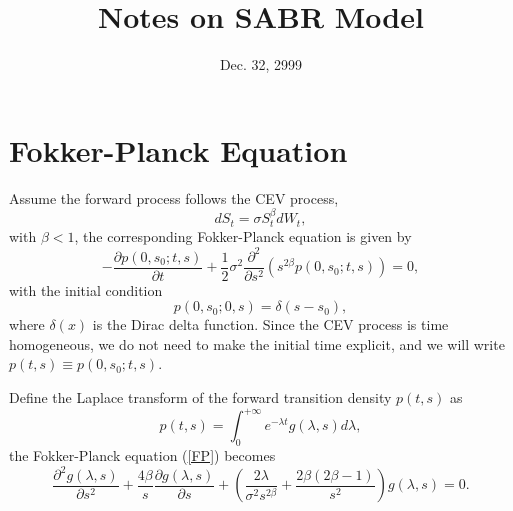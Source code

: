 \documentclass[12pt]{article}
\begin{document}
\title{Notes on SABR Model}
\date{Dec. 32, 2999}

\maketitle

\section{Fokker-Planck Equation}

  Assume the forward process follows the CEV process,
  \begin{equation}
    dS_t=\sigma S_t^{\beta}dW_t,
    \label{CEV}
  \end{equation}
  with $\beta < 1$, the corresponding Fokker-Planck equation is given by
  \begin{equation}
    -\frac{\partial p(0,s_0;t,s)}{\partial t}+\frac{1}{2}\sigma^2\frac{\partial^2}{\partial s^2}
    \left(s^{2\beta}p(0,s_0;t,s)\right) = 0,
    \label{FP}
  \end{equation}
  with the initial condition
  \begin{equation}
    p(0,s_0;0,s) = \delta(s-s_0),
    \label{initial}
  \end{equation}
  where $\delta(x)$ is the Dirac delta function. Since the CEV process is time homogeneous, we do not need
  to make the initial time explicit, and we will write $p(t,s)\equiv p(0,s_0;t,s)$.

  Define the Laplace transform of the forward transition density $p(t,s)$ as \cite{Lesniewski}
  \begin{equation}
    p(t,s)=\int_0^{+\infty}e^{-\lambda t}g(\lambda, s)d\lambda,
    \label{Laplace}
  \end{equation}
  the Fokker-Planck equation (\ref{FP}) becomes
  \begin{equation}
    \frac{\partial^2g(\lambda,s)}{\partial s^2}+\frac{4\beta}{s}\frac{\partial g(\lambda,s)}{\partial s}
    + \left(\frac{2\lambda}{\sigma^2 s^{2\beta}}+\frac{2\beta(2\beta-1)}{s^2}\right)g(\lambda, s) = 0.
    \label{FP2}
  \end{equation}
\end{document}
